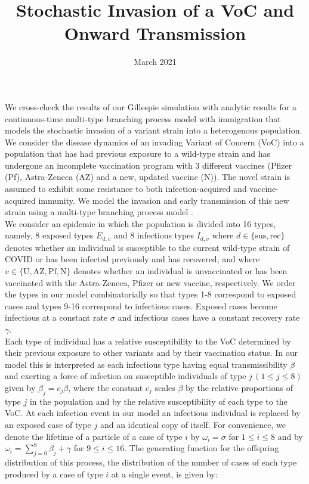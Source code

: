 \documentclass{article}
\title{Stochastic Invasion of a VoC and Onward Transmission}
\date{March 2021}
\begin{document}
\maketitle

We cross-check the results of our Gillespie simulation with analytic results for a continuous-time multi-type branching process model with immigration that models the stochastic invasion of a variant strain into a heterogenous population. \\

We consider the disease dynamics of an invading Variant of Concern (VoC) into a population that has had previous exposure to a wild-type strain and has undergone an incomplete vaccination program with 3 different vaccines (Pfizer (Pf), Astra-Zeneca (AZ) and a new, updated vaccine (N)). The novel strain is assumed to exhibit some resistance to both infection-acquired and vaccine-acquired immunity. We model the invasion and early transmission of this new strain using a multi-type branching process model \cite{dorman2004garden}. \\ 

We consider an epidemic in which the population is divided into 16 types, namely, 8 exposed types $E_{d, v}$ and 8 infectious types $I_{d, v}$ where $d \in \{\mathrm{sus, rec}\}$ denotes whether an individual is susceptible to the current wild-type strain of COVID or has been infected previously and has recovered,  and where $v\in\{ \mathrm{U, AZ, Pf, N}\}$ denotes whether an individual is unvaccinated or has been vaccinated with the Astra-Zeneca, Pfizer or new vaccine, respectively. We order the types in our model combinatorially so that types 1-8 correspond to exposed cases and types 9-16 correspond to infectious cases. Exposed cases become infectious at a constant rate $\sigma$ and infectious cases have a constant recovery rate $\gamma$. \\

Each type of individual has a relative susceptibility to the VoC determined by their previous exposure to other variants and by their vaccination status. In our model this is interpreted as each infectious type having equal transmissibility $\beta$ and exerting a force of infection on susceptible individuals of type $j \, (1 \leq j \leq 8)$ given by $\beta_j = c_j \beta$, where the constant $c_j$ scales $\beta$ by the relative proportions of type $j$ in the population and by the relative susceptibility of each type to the VoC. At each infection event in our model an infectious individual is replaced by an exposed case of type $j$ and an identical copy of itself. For convenience, we denote the lifetime of a particle of a case of type $i$ by $\omega_i = \sigma$ for  $1 \leq i \leq 8$ and by $\omega_i = \sum_{j=0}^8 \beta_j + \gamma$ for $9 \leq i \leq 16$. The generating function for the offspring distribution of this process, the distribution of the number of cases of each type produced by a case of type $i$ at a single event, is given by:
\end{document}
